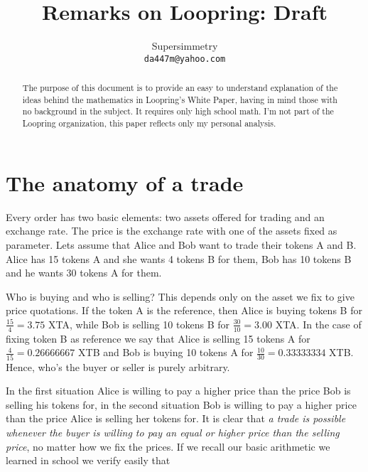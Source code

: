 \documentclass{article}
\theoremstyle{remark}
\theoremstyle{definition}
\begin{document}
\title{Remarks on Loopring: Draft}
\author{Supersimmetry\\
        \texttt{da447m@yahoo.com}}

\date{}
\maketitle

\begin{abstract}
The purpose of this document is to provide an easy to understand explanation of the ideas behind the mathematics in Loopring's White Paper, having in mind those with no background in the subject. It requires only high school math. I'm not part of the Loopring organization, this paper reflects only my personal analysis.
\end{abstract}

\tableofcontents
\clearpage

\section{The anatomy of a trade}\label{sect:sect1}

Every order has two basic elements: two assets offered for trading and an exchange rate. The price is the exchange rate with one of the assets fixed as parameter. Lets assume that Alice and Bob want to trade their tokens A and B. Alice has 15 tokens A and she wants 4 tokens B for them, Bob has 10 tokens B and he wants 30 tokens A for them.

Who is buying and who is selling? This depends only on the asset we fix to give price quotations. If the token A is the reference, then Alice is buying tokens B for $\frac{15}{4}=3.75$ XTA, while Bob is selling 10 tokens B for $\frac{30}{10}=3.00$ XTA. In the case of fixing token B as reference we say that Alice is selling 15 tokens A for $\frac{4}{15}=0.26666667$ XTB and Bob is buying 10 tokens A for $\frac{10}{30}=0.33333334$ XTB. Hence, who's the buyer or seller is purely arbitrary.

In the first situation Alice is willing to pay a higher price than the price Bob is selling his tokens for, in the second situation Bob is willing to pay a higher price than the price Alice is selling her tokens for. It is clear that \emph{a trade is possible whenever the buyer is willing to pay an equal or higher price than the selling price}, no matter how we fix the prices. If we recall our basic arithmetic we learned in school we verify easily that
\end{document}
